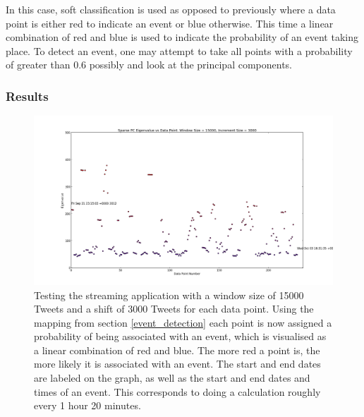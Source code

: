 \documentclass[11pt,a4paper]{article}
\begin{document}
In this case, soft classification is used as opposed to previously where a data point is either red to indicate an event or blue otherwise. This time a linear combination of red and blue is used to indicate the probability of an event taking place. To detect an event, one may attempt to take all points with a probability of greater than 0.6 possibly and look at the principal components.

\subsubsection{Results}
\begin{figure}[H]
\centering
\includegraphics[scale=0.35]{Twitter_Data_All_Graph.png}
\caption{Testing the streaming application with a window size of 15000 Tweets and a shift of 3000 Tweets for each data point. Using the mapping from section \ref{event_detection} each point is now assigned a probability of being associated with an event, which is visualised as a linear combination of red and blue. The more red a point is, the more likely it is associated with an event. The start and end dates are labeled on the graph, as well as the start and end dates and times of an event. This corresponds to doing a calculation roughly every 1 hour 20 minutes.}
\label{testing_app_all_data}
\end{figure}
\end{document}
